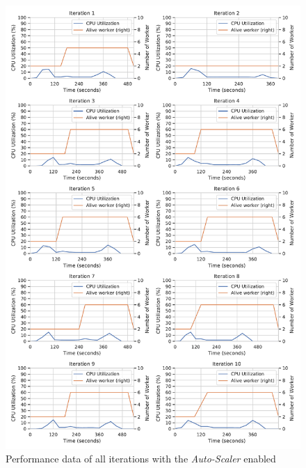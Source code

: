 \begin{figure}[h]
\centering
\includegraphics[scale=0.4]{images/07_evaluation/regression/auto-scaler_performance}
\caption{Performance data of all iterations with the \textit{Auto-Scaler} enabled}
\label{fig:appendix_eval_regression_auto-scaler}
\end{figure}
